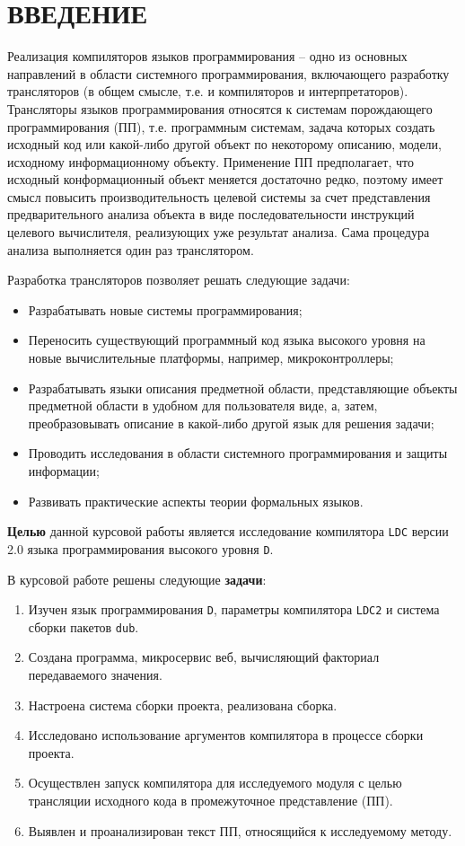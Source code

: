 \documentclass{studrep}
\begin{document}
\tableofcontents

\chapter*{ВВЕДЕНИЕ}
\label{chap:intro}

Реализация компиляторов языков программирования -- одно из основных направлений в области системного программирования, включающего разработку трансляторов (в общем смысле, т.е. и компиляторов и интерпретаторов).  Трансляторы языков программирования относятся к системам порождающего программирования (ПП), т.е. программным системам, задача которых создать исходный код или какой-либо другой объект по некоторому описанию, модели, исходному информационному объекту.  Применение ПП предполагает, что исходный конформационный объект меняется достаточно редко, поэтому имеет смысл повысить производительность целевой системы за счет представления предварительного анализа объекта в виде последовательности инструкций целевого вычислителя, реализующих уже результат анализа.  Сама процедура анализа выполняется один раз транслятором.

Разработка трансляторов позволяет решать следующие задачи:
\begin{itemize}
\item Разрабатывать новые системы программирования;
\item Переносить существующий программный код языка высокого уровня на новые вычислительные платформы, например, микроконтроллеры;
\item Разрабатывать языки описания предметной области, представляющие объекты предметной области в удобном для пользователя виде, а, затем, преобразовывать описание в какой-либо другой язык для решения задачи;
\item Проводить исследования в области системного программирования и защиты информации;
\item Развивать практические аспекты теории формальных языков.
\end{itemize}

\textbf{Целью} данной курсовой работы является исследование компилятора \verb|LDC| версии 2.0 языка программирования высокого уровня \verb|D|.

В курсовой работе решены следующие \textbf{задачи}:
\begin{enumerate}
\item Изучен язык программирования \verb|D|, параметры компилятора \verb|LDC2| и система сборки пакетов \verb|dub|.
\item Создана программа, микросервис веб, вычисляющий факториал передаваемого значения.
\item Настроена система сборки проекта, реализована сборка.
\item Исследовано использование аргументов компилятора в процессе сборки проекта.
\item Осуществлен запуск компилятора для исследуемого модуля с целью трансляции исходного кода в промежуточное представление (ПП).
\item Выявлен и проанализирован текст ПП, относящийся к исследуемому методу.
\end{enumerate}
\end{document}
